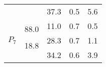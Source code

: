\documentclass[11p]{article}
\begin{document}
\begin{tabular}{|c|cccc|}
 &  & \multirow{2}{*}{37.3} & \multirow{2}{*}{0.5} & \multirow{2}{*}{5.6} \\ %
 & & & & \\ \hline \hline
\multirow{6}{*}{$P_7$} & & \multirow{2}{*}{11.0} & \multirow{2}{*}{0.7} & \multirow{2}{*}{0.5} \\ %
 & \multirow{2}{*}{88.0} & & & \\ \cline{3-5} 
 &  & \multirow{2}{*}{28.3} & \multirow{2}{*}{0.7} & \multirow{2}{*}{1.1} \\ %
 & \multirow{2}{*}{18.8} & & & \\ \cline{3-5} 
 &  & \multirow{2}{*}{34.2} & \multirow{2}{*}{0.6} & \multirow{2}{*}{3.9} \\ %
 &  & & & \\ \hline
\end{tabular}
\end{document}
